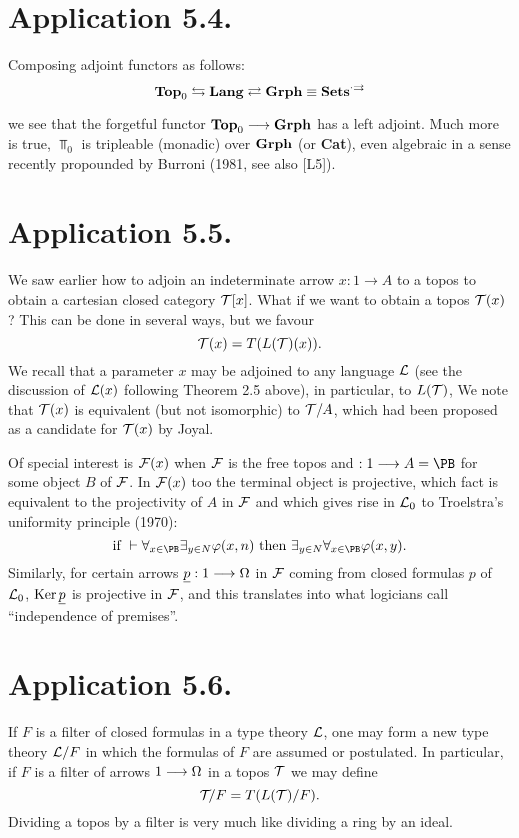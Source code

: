 \section*{Application 5.4.}

Composing adjoint functors as follows:
\[
{\mathbf {Top}}_0 \leftrightarrows {\mathbf {Lang}} \rightleftarrows {\mathbf {Grph}} \equiv {\mathbf {Sets}}^{\cdot\rightrightarrows}
\]

we see that the forgetful functor ${\mathbf {Top}}_0 \longrightarrow {\mathbf {Grph}}$ has a left adjoint. Much more
is true, $\Top_0$ is tripleable (monadic) over ${\mathbf {Grph}}$ (or {\bf Cat}), even algebraic
in a sense recently propounded by Burroni (1981, see also [L5]).

\section*{Application 5.5.}

We saw earlier how to adjoin an indeterminate arrow
$x: 1 \to A$ to a topos to obtain a cartesian closed category ${\mathcal T}[x]$. What if we
want to obtain a topos ${\mathcal T}(x)$? This can be done in several ways, but we favour
\[
{\mathcal T}(x) = T(L({\mathcal T}) (x)).
\]
We recall that a parameter $x$ may be adjoined to any language ${\mathcal L}$ (see the
discussion of ${\mathcal L}(x)$ following Theorem 2.5 above), in particular, to $L({\mathcal T})$,
We note that ${\mathcal T}(x)$ is equivalent (but not isomorphic) to ${\mathcal T}/A$, which had been
proposed as a candidate for ${\mathcal T}(x)$ by Joyal.

Of special interest is ${\mathcal F}(x)$ when ${\mathcal F}$ is the free topos and
$: 1 \to A = \PB$ for some object $B$ of ${\mathcal F}$. In ${\mathcal F}(x)$ too the terminal object
is projective, which fact is equivalent to the projectivity of $A$ in ${\mathcal F}$ and
which gives rise in ${\mathcal L}_0$ to Troelstra's uniformity principle (1970):
\[
\text{if } \ent\forall_{x \in \PB}\exists_{y \in N} \pf(x,n) \text{ then } 
\exists_{y \in N}\forall_{x \in \PB} \pf(x,y) .
\]
Similarly, for certain arrows $\underline{p} : 1 \longrightarrow \Omega$ in ${\mathcal F}$ coming
from closed formulas $p$ of ${\mathcal L}_0$, $\mathop{\rm Ker} \underline{p}$ is projective in ${\mathcal F}$,
and this translates into what logicians call ``independence of premises''.

\section*{Application 5.6.}

If $F$ is a filter of closed formulas in a type theory
${\mathcal L}$, one may form a new type theory ${\mathcal L}/F$ in which the formulas of $F$ are
assumed or postulated. In particular, if $F$ is a filter of arrows $1 \longrightarrow \Omega$
in a topos ${\mathcal T}$ we may define
\[
{\mathcal T}\!/F = T(L({\mathcal T})/F) .
\]
Dividing a topos by a filter is very much like dividing a ring by an ideal.

